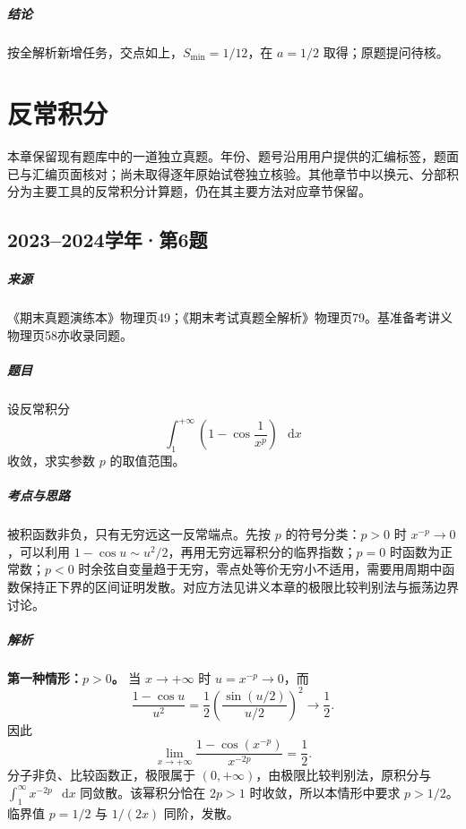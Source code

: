 \documentclass[UTF8,fontset=fandol,12pt,oneside,openany]{ctexrep}
\newcommand{\dd}{\mathop{}\!\mathrm d}
\theoremstyle{definition}
\begin{document}
\paragraph{结论}按全解析新增任务，交点如上，$S_{\min}=1/12$，在 $a=1/2$ 取得；原题提问待核。


\chapter{反常积分}
\label{exam:13:chapter}

本章保留现有题库中的一道独立真题。年份、题号沿用用户提供的汇编标签，题面已与汇编页面核对；尚未取得逐年原始试卷独立核验。其他章节中以换元、分部积分为主要工具的反常积分计算题，仍在其主要方法对应章节保留。

\par\addvspace{18pt}\noindent\begin{minipage}{\linewidth}
\section{2023--2024学年·第6题}
\label{exam:13:2023-2024-6}
\paragraph{来源} 《期末真题演练本》物理页49；《期末考试真题全解析》物理页79。基准备考讲义物理页58亦收录同题。
\paragraph{题目} 设反常积分
\[
\int_1^{+\infty}\left(1-\cos\frac1{x^p}\right)\,\dd x
\]
收敛，求实参数 $p$ 的取值范围。
\end{minipage}\par
\paragraph{考点与思路} 被积函数非负，只有无穷远这一反常端点。先按 $p$ 的符号分类：$p>0$ 时 $x^{-p}\to0$，可以利用 $1-\cos u\sim u^2/2$，再用无穷远幂积分的临界指数；$p=0$ 时函数为正常数；$p<0$ 时余弦自变量趋于无穷，零点处等价无穷小不适用，需要用周期中函数保持正下界的区间证明发散。对应方法见讲义本章的极限比较判别法与振荡边界讨论。

\paragraph{解析}
\textbf{第一种情形：$p>0$。} 当 $x\to+\infty$ 时 $u=x^{-p}\to0$，而
\[
\frac{1-\cos u}{u^2}
=\frac12\left(\frac{\sin(u/2)}{u/2}\right)^2\to\frac12.
\]
因此
\[
\lim_{x\to+\infty}\frac{1-\cos(x^{-p})}{x^{-2p}}=\frac12.
\]
分子非负、比较函数正，极限属于 $(0,+\infty)$，由极限比较判别法，原积分与 $\int_1^\infty x^{-2p}\,\dd x$ 同敛散。该幂积分恰在 $2p>1$ 时收敛，所以本情形中要求 $p>1/2$。临界值 $p=1/2$ 与 $1/(2x)$ 同阶，发散。
\end{document}
